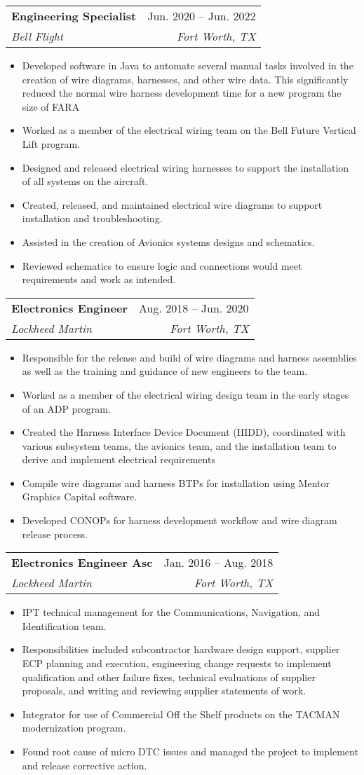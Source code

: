 \documentclass[letterpaper,11pt]{article}
\makeatletter
\newcommand{\resumeItem}[1]{
  \item\small{
    {#1 \vspace{-2pt}}
  }
}
\newcommand{\resumeSubheading}[4]{
  \vspace{-2pt}\item
    \begin{tabular*}{0.97\textwidth}[t]{l@{\extracolsep{\fill}}r}
      \textbf{#1} & #2 \\
      \textit{\small#3} & \textit{\small #4} \\
    \end{tabular*}\vspace{-7pt}
}
\newcommand{\resumeItemListStart}{\begin{itemize}}
\newcommand{\resumeItemListEnd}{\end{itemize}\vspace{-5pt}}
\makeatother
\begin{document}
    \resumeSubheading
      {Engineering Specialist}{Jun. 2020 -- Jun. 2022}
      {Bell Flight}{Fort Worth, TX}
      \resumeItemListStart
        \resumeItem{Developed software in Java to automate several manual tasks involved in the creation of wire diagrams, harnesses, and other wire data. This significantly reduced the normal wire harness development time for a new program the size of FARA}
        \resumeItem{Worked as a member of the electrical wiring team on the Bell Future Vertical Lift program.}
        \resumeItem{Designed and released electrical wiring harnesses to support the installation of all systems on the aircraft. }
        \resumeItem{Created, released, and maintained electrical wire diagrams to support installation and troubleshooting. }
        \resumeItem{Assisted in the creation of Avionics systems designs and schematics.}
        \resumeItem{Reviewed schematics to ensure logic and connections would meet requirements and work as intended.}
      \resumeItemListEnd

      \resumeSubheading
      {Electronics Engineer}{Aug. 2018 -- Jun. 2020}
      {Lockheed Martin}{Fort Worth, TX}
      \resumeItemListStart
        \resumeItem{Responsible for the release and build of wire diagrams and harness assemblies as well as the training and guidance of new engineers to the team.}
        \resumeItem{Worked as a member of the electrical wiring design team in the early stages of an ADP program.}
        \resumeItem{Created the Harness Interface Device Document (HIDD), coordinated with various subsystem teams, the avionics team, and the installation team to derive and implement electrical requirements}
        \resumeItem{Compile wire diagrams and harness BTPs for installation using Mentor Graphics Capital software.}
        \resumeItem{Developed CONOPs for harness development workflow and wire diagram release process.}
      \resumeItemListEnd

      \resumeSubheading
      {Electronics Engineer Asc}{Jan. 2016 -- Aug. 2018}
      {Lockheed Martin}{Fort Worth, TX}
      \resumeItemListStart
        \resumeItem{IPT technical management for the Communications, Navigation, and Identification team. }
        \resumeItem{Responsibilities included subcontractor hardware design support, supplier ECP planning and execution, engineering change requests to implement qualification and other failure fixes, technical evaluations of supplier proposals, and writing and reviewing supplier statements of work.}
        \resumeItem{Integrator for use of Commercial Off the Shelf products on the TACMAN modernization program.}
        \resumeItem{Found root cause of micro DTC issues and managed the project to implement and release corrective action.}
      \resumeItemListEnd
\end{document}
